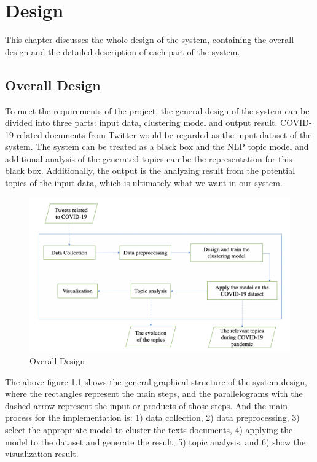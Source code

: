 \chapter{Design}
\label{ch:design}

This chapter discusses the whole design of the system, containing the overall design and the detailed description of each part of the system. 

\section{Overall Design}
To meet the requirements of the project, the general design of the system can be divided into three parts: input data, clustering model and output result. COVID-19 related documents from Twitter would be regarded as the input dataset of the system. The system can be treated as a black box and the NLP topic model and additional analysis of the generated topics can be the representation for this black box. Additionally, the output is the analyzing result from the potential topics of the input data, which is ultimately what we want in our system. 

\begin{figure}[H]
    \centering
    \includegraphics[scale=0.4]{images/overall_design.png}
    \caption{Overall Design}
    \label{fig:1}
\end{figure}

The above figure \ref{fig:1} shows the general graphical structure of the system design, where the rectangles represent the main steps, and the parallelograms with the dashed arrow represent the input or products of those steps. And the main process for the implementation is: 1) data collection, 2) data preprocessing, 3) select the appropriate model to cluster the texts documents, 4) applying the model to the dataset and generate the result, 5) topic analysis, and 6) show the visualization result. 

